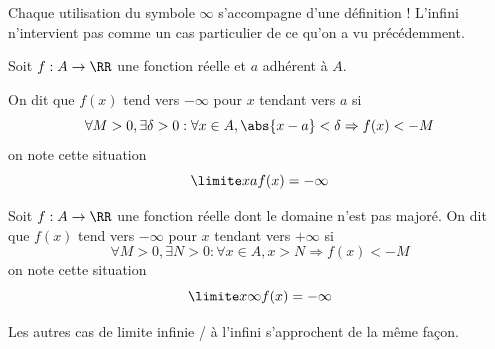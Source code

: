 \begin{frame}%
  \begin{remark*}
    Chaque utilisation du symbole \(\infty\) s'accompagne d'une définition ! L'infini n'intervient pas comme un cas particulier de ce qu'on a vu précédemment.
  \end{remark*}

  \begin{definition}
    Soit \(f : A \to \RR\) une fonction réelle et \(a\) adhérent à \(A\).

    On dit que \(f(x)\) tend vers \(-\infty\) pour \(x\) tendant vers \(a\) si
    \begin{equation*}
      \forall M > 0, \exists \delta > 0 : \forall x \in A, \abs{x-a}<\delta \Rightarrow f(x) < -M
    \end{equation*}
    on note cette situation
    \begin{equation*}
      \limite x a f(x) = -\infty
    \end{equation*}
  \end{definition}
\end{frame}
\begin{frame}%
  \begin{definition}
    Soit \(f : A \to \RR\) une fonction réelle dont le domaine n'est pas majoré. On dit que \(f(x)\) tend vers \(-\infty\) pour \(x\) tendant vers \(+\infty\) si
    \begin{equation*}
      \forall M > 0, \exists N > 0 : \forall x \in A, x > N \Rightarrow f(x) < -M
    \end{equation*}
    on note cette situation
    \begin{equation*}
      \limite x \infty f(x) = -\infty
    \end{equation*}
  \end{definition}
  \begin{remark}
    Les autres cas de limite infinie / à l'infini s'approchent de la même fa\c{c}on.
  \end{remark}
\end{frame}

